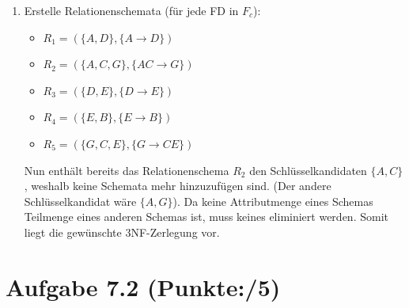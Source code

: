 \documentclass[11pt, a4paper]{article}
\newcommand{\blattnummer}{7}
\newcommand{\pp}{5}
\newcommand{\aufgabe}[2] {\section*{Aufgabe \blattnummer.#1 (Punkte:\qquad/#2)}}
\begin{document}
\begin{enumerate}
\item Erstelle Relationenschemata (für jede FD in $F_c$):
\begin{itemize}
\item $R_1=(\{ A,D\},\{ A \rightarrow D\})$
\item $R_2=(\{ A,C,G\},\{ AC \rightarrow G\})$
\item $R_3=(\{ D,E\},\{ D \rightarrow E\})$
\item $R_4=(\{ E,B\},\{ E \rightarrow B\})$
\item $R_5=(\{ G,C,E\},\{ G \rightarrow CE\})$
\end{itemize}
Nun enthält bereits das Relationenschema $R_2$ den Schlüsselkandidaten $\{ A,C\}$, weshalb keine Schemata mehr hinzuzufügen sind. (Der andere Schlüsselkandidat wäre $\{ A,G\}$).
Da keine Attributmenge eines Schemas Teilmenge eines anderen Schemas ist, muss keines eliminiert werden. Somit liegt die gewünschte 3NF-Zerlegung vor.

\end{enumerate}



\aufgabe{2}{\pp}
\begin{adjustwidth}{20pt}{20pt}

\end{adjustwidth}
\end{document}
